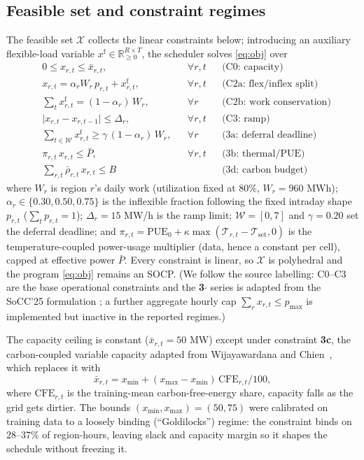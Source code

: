\documentclass[12pt]{article}
\newcommand{\R}{\mathbb{R}}
\begin{document}
\subsection{Feasible set and constraint regimes}\label{sec:constraints}
The feasible set $\mathcal{X}$ collects the linear constraints below; introducing an
auxiliary flexible-load variable $x^{\mathrm f}\in\R^{R\times T}_{\ge0}$, the
scheduler solves \eqref{eq:obj} over
\begin{subequations}\label{eq:feasible}
\begin{align}
&0\le x_{r,t}\le\bar x_{r,t}, && \forall r,t
  &&\text{(C0: capacity)}\\[2pt]
&x_{r,t}=\alpha_r W_r\,p_{r,t}+x^{\mathrm f}_{r,t}, && \forall r,t
  &&\text{(C2a: flex/inflex split)}\\[2pt]
&\textstyle\sum_{t} x^{\mathrm f}_{r,t}=(1-\alpha_r)\,W_r, && \forall r
  &&\text{(C2b: work conservation)}\\[2pt]
&\lvert x_{r,t}-x_{r,t-1}\rvert\le\Delta_r, && \forall r,t
  &&\text{(C3: ramp)}\\[2pt]
&\textstyle\sum_{t\in\mathcal W} x^{\mathrm f}_{r,t}\ge\gamma\,(1-\alpha_r)\,W_r,
  && \forall r &&\text{(3a: deferral deadline)}\\[2pt]
&\pi_{r,t}\,x_{r,t}\le\bar P, && \forall r,t
  &&\text{(3b: thermal/PUE)}\\[2pt]
&\textstyle\sum_{r,t}\bar\rho_{r,t}\,x_{r,t}\le B
  && &&\text{(3d: carbon budget)}
\end{align}
\end{subequations}
where $W_r$ is region $r$'s daily work (utilization fixed at $80\%$, $W_r=960$ MWh);
$\alpha_r\in\{0.30,0.50,0.75\}$ is the inflexible fraction following the fixed
intraday shape $p_{r,t}$ ($\sum_t p_{r,t}=1$); $\Delta_r=15$ MW/h is the ramp limit;
$\mathcal W=[0,7]$ and $\gamma=0.20$ set the deferral deadline; and
$\pi_{r,t}=\mathrm{PUE}_0+\kappa\max(\mathcal T_{r,t}-\mathcal T_{\mathrm{set}},0)$
is the temperature-coupled power-usage multiplier (data, hence a constant per cell),
capped at effective power $\bar P$. Every constraint is linear, so $\mathcal X$ is
polyhedral and the program \eqref{eq:obj} remains an SOCP. (We follow the source
labelling: C0--C3 are the base operational constraints and the \textbf{3$\cdot$}
series is adapted from the SoCC'25 formulation \citep{wijayawardana2025}; a further
aggregate hourly cap $\sum_r x_{r,t}\le p_{\max}$ is implemented but inactive in the
reported regimes.)

The capacity ceiling is constant ($\bar x_{r,t}=50$ MW) except under constraint
\textbf{3c}, the carbon-coupled variable capacity adapted from Wijayawardana and
Chien~\citep{wijayawardana2025}, which replaces it with
\begin{equation}
\bar x_{r,t}=x_{\min}+(x_{\max}-x_{\min})\,\mathrm{CFE}_{r,t}/100,
\label{eq:varcap}
\end{equation}
where $\mathrm{CFE}_{r,t}$ is the training-mean carbon-free-energy share, capacity
falls as the grid gets dirtier. The bounds $(x_{\min},x_{\max})=(50,75)$ were
calibrated on training data to a loosely binding (``Goldilocks'') regime: the
constraint binds on $28$--$37\%$ of region-hours, leaving slack and capacity margin so
it shapes the schedule without freezing it.
\end{document}
